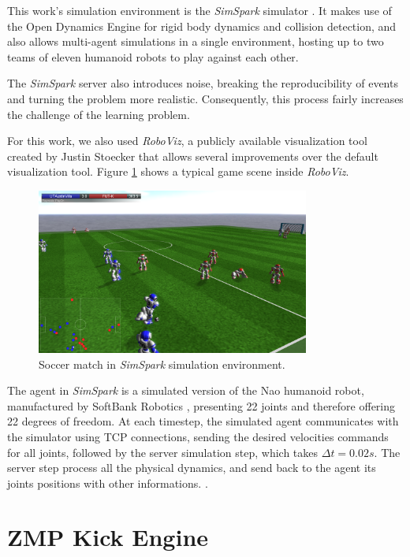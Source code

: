 This work's simulation environment is the \textit{SimSpark} simulator \cite{Simspark}. It makes use of the Open Dynamics Engine \cite{ODE} for rigid body dynamics and collision detection, and also allows multi-agent simulations in a single environment, hosting up to two teams of eleven humanoid robots to play against each other.

The \textit{SimSpark} server also introduces noise, breaking the reproducibility of events and turning the problem more realistic. Consequently, this process fairly increases the challenge of the learning problem.

For this work, we also used \textit{RoboViz}, a publicly available visualization tool created by Justin Stoecker \cite{RoboViz} that allows several improvements over the default visualization tool. Figure \ref{fig:roboviz_game} shows a typical game scene inside \textit{RoboViz}.

\begin{figure}[H]
    \centering
    \includegraphics[width=0.8\textwidth]{Chapter5/sim3d.png} 
    \caption{Soccer match in \textit{SimSpark} simulation environment.}
    \label{fig:roboviz_game}
\end{figure}

The agent in \textit{SimSpark} is a simulated version of the Nao humanoid robot, manufactured by SoftBank Robotics \cite{NaoRobot}, presenting 22 joints and therefore offering 22 degrees of freedom. At each timestep, the simulated agent communicates with the simulator using TCP connections, sending the desired velocities commands for all joints, followed by the server simulation step, which takes $\Delta t = 0.02s$. The server step process all the physical dynamics, and send back to the agent its joints positions with other informations. \cite{SimSparkEffectors}.

\section{ZMP Kick Engine}
\label{sec:ZMPkick}

